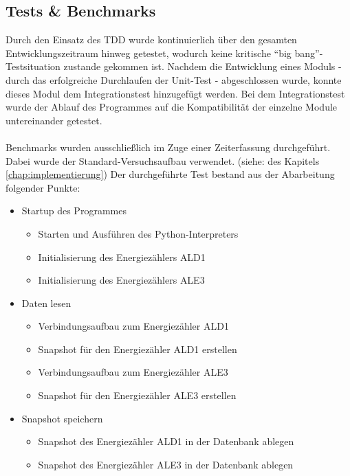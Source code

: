 \documentclass[Bachelorarbeit.tex]{subfiles}
\begin{document}
\subsection{Tests \& Benchmarks}
\label{subsec:tests_benchmark}
Durch den Einsatz des \ac{TDD} wurde kontinuierlich über den gesamten Entwicklungszeitraum hinweg getestet, wodurch keine kritische "`big bang"'-Testsituation zustande gekommen ist. 
Nachdem die Entwicklung eines Moduls - durch das erfolgreiche Durchlaufen der Unit-Test - abgeschlossen wurde, konnte dieses Modul dem Integrationstest hinzugefügt werden. Bei dem Integrationstest wurde der Ablauf des Programmes auf die Kompatibilität der einzelne Module untereinander getestet.\\
\\
Benchmarks wurden ausschließlich im Zuge einer Zeiterfassung durchgeführt. Dabei wurde der Standard-Versuchsaufbau verwendet. (siehe:  des Kapitels \ref{chap:implementierung}) Der durchgeführte Test bestand aus der Abarbeitung folgender Punkte:
\begin{itemize}
\item Startup des Programmes
\begin{itemize}
\item Starten und Ausführen des Python-Interpreters
\item Initialisierung des Energiezählers \acs{ALD1}
\item Initialisierung des Energiezählers \acs{ALE3}
\end{itemize}
%
\item Daten lesen
\begin{itemize}
\item Verbindungsaufbau zum Energiezähler \acs{ALD1}
\item Snapshot für den Energiezähler \acs{ALD1} erstellen
\item Verbindungsaufbau zum Energiezähler \acs{ALE3}
\item Snapshot für den Energiezähler \acs{ALE3} erstellen
\end{itemize}
%
\item Snapshot speichern
\begin{itemize}
\item Snapshot des Energiezähler \acs{ALD1} in der Datenbank ablegen
\item Snapshot des Energiezähler \acs{ALE3} in der Datenbank ablegen
\end{itemize}
%
\end{itemize}
\end{document}
